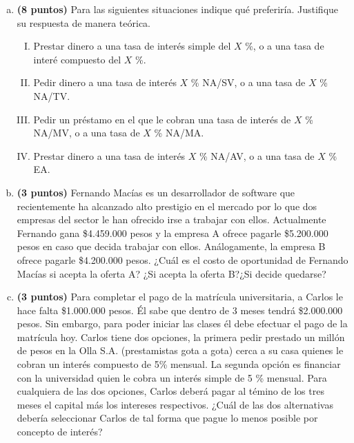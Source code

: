 \documentclass[../main.tex]{subfiles}
\begin{document}
\begin{enumerate}[(a)]

\item \textbf{(8 puntos)} Para las siguientes situaciones indique qué preferiría. Justifique su respuesta de manera teórica.

\begin{enumerate}[(I)]

\item Prestar dinero a una tasa de interés simple del $X$ \%, o a una tasa de interé compuesto del $X$ \%.

\item Pedir dinero a una tasa de interés $X$ \% NA/SV, o a una tasa de $X$ \% NA/TV.

\item Pedir un préstamo en el que le cobran una tasa de interés de $X$ \% NA/MV, o a una tasa de $X$ \% NA/MA.
\item Prestar dinero a una tasa de interés $X$ \% NA/AV, o a una tasa de $X$ \% EA.

\end{enumerate}

\item \textbf{(3 puntos)} Fernando Macías es un desarrollador de software que recientemente ha alcanzado alto prestigio en el mercado por lo que dos empresas del sector le han ofrecido irse a trabajar con ellos. Actualmente Fernando gana \$4.459.000 pesos y la empresa A ofrece pagarle \$5.200.000 pesos en caso que decida trabajar con ellos. Análogamente, la empresa B ofrece pagarle \$4.200.000 pesos. ¿Cuál es el costo de oportunidad de Fernando Macías si acepta la oferta A? ¿Si acepta la oferta B?¿Si decide quedarse?

\item \textbf{(3 puntos)} Para completar el pago de la matrícula universitaria, a Carlos le hace falta \$1.000.000 pesos. Él sabe que dentro de 3 meses tendrá \$2.000.000 pesos. Sin embargo, para poder iniciar las clases  él debe efectuar el pago de la matrícula hoy. Carlos tiene dos opciones, la primera pedir prestado un millón de pesos en la Olla S.A. (prestamistas gota a gota) cerca a su casa quienes le cobran un interés compuesto de 5\% mensual. La segunda opción es financiar con la universidad quien le cobra un interés simple de 5 \% mensual. Para cualquiera de las dos opciones, Carlos deberá pagar al témino de los tres meses el capital más los intereses respectivos. ¿Cuál de las dos alternativas debería seleccionar Carlos de tal forma que pague lo menos posible por concepto de interés?


\end{enumerate}
\end{document}
